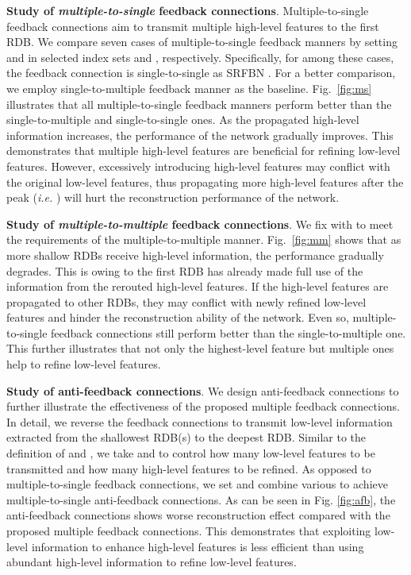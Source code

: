 \documentclass{bmvc2k}
\begin{document}
	\noindent \textbf{Study of \textit{multiple-to-single} feedback connections}. Multiple-to-single feedback connections aim to transmit multiple high-level features to the first RDB. We compare seven cases of multiple-to-single feedback manners by setting  and  in selected index sets  and , respectively. Specifically, for  among these cases, the feedback connection is single-to-single as SRFBN \cite{li2019srfbn}. For a better comparison, we employ single-to-multiple feedback manner \cite{jin2017multi, zhang2018progressive} as the baseline. Fig.~\ref{fig:ms} illustrates that all multiple-to-single feedback manners perform better than the single-to-multiple and single-to-single ones. As the propagated high-level information increases, the performance of the network gradually improves. This demonstrates that multiple high-level features are beneficial for refining low-level features. However, excessively introducing high-level features may conflict with the original low-level features, thus propagating more high-level features after the peak (\textit{i.e.} ) will hurt the reconstruction performance of the network.

	\noindent \textbf{Study of \textit{multiple-to-multiple} feedback connections}. We fix  with  to meet the requirements of the multiple-to-multiple manner. Fig.~\ref{fig:mm} shows that as more shallow RDBs receive high-level information, the performance gradually degrades. This is owing to the first RDB has already made full use of the information from the rerouted high-level features. If the high-level features are propagated to other RDBs, they may conflict with newly refined low-level features and hinder the reconstruction ability of the network. Even so, multiple-to-single feedback connections still perform better than the single-to-multiple one. This further illustrates that not only the highest-level feature but multiple ones help to refine low-level features.
	
	\noindent \textbf{Study of anti-feedback connections}. We design anti-feedback connections to further illustrate the effectiveness of the proposed multiple feedback connections. In detail, we reverse the feedback connections to transmit low-level information extracted from the shallowest RDB(s) to the deepest RDB. Similar to the definition of  and , we take  and  to control how many low-level features to be transmitted and how many high-level features to be refined. As opposed to multiple-to-single feedback connections, we set  and combine various  to achieve multiple-to-single anti-feedback connections. As can be seen in Fig. \ref{fig:afb}, the anti-feedback connections shows worse reconstruction effect compared with the proposed multiple feedback connections. This demonstrates that exploiting low-level information to enhance high-level features is less efficient than using abundant high-level information to refine low-level features. 
\end{document}

